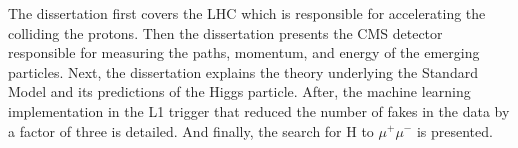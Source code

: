 The dissertation first covers the LHC which is responsible for accelerating the colliding the protons. Then the dissertation presents the CMS detector responsible for measuring the paths, momentum, and energy of the emerging particles. Next, the dissertation explains the theory underlying the Standard Model and its predictions of the Higgs particle. After, the machine learning implementation in the L1 trigger that reduced the number of fakes in the data by a factor of three is detailed. And finally, the search for H to $\mu^{+}\mu^{-}$ is presented.
